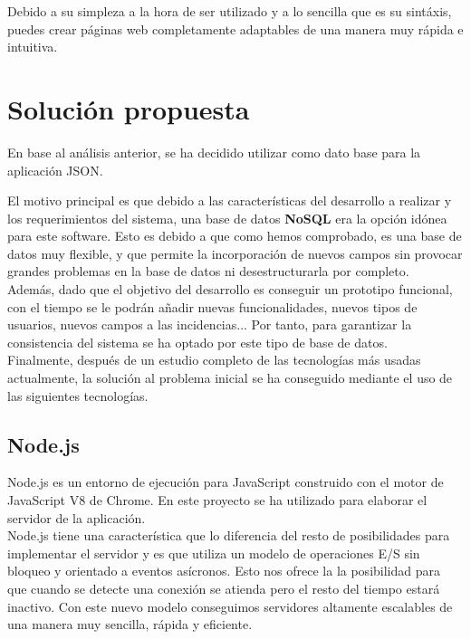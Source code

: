 Debido a su simpleza a la hora de ser utilizado y a lo sencilla que es su sintáxis, puedes crear páginas web completamente adaptables de una manera muy rápida e intuitiva.

\section{Solución propuesta}

En base al análisis anterior, se ha decidido utilizar como dato base para la aplicación JSON\cite{json}.

El motivo principal es que debido a las características del desarrollo a realizar y los requerimientos del sistema,
una base de datos \textbf{NoSQL} era la opción idónea para este software. Esto es debido a que como hemos comprobado,
es una base de datos muy flexible, y que permite la incorporación de nuevos campos sin provocar grandes problemas en 
la base de datos ni desestructurarla por completo.\\

Además, dado que el objetivo del desarrollo es conseguir un prototipo funcional, con el tiempo se le podrán añadir
nuevas funcionalidades, nuevos tipos de usuarios, nuevos campos a las incidencias... Por tanto, para garantizar 
la consistencia del sistema se ha optado por este tipo de base de datos.\\

Finalmente, después de un estudio completo de las tecnologías más usadas actualmente, la solución al problema inicial se ha conseguido 
mediante el uso de las siguientes tecnologías.

\subsection{Node.js}

Node.js es un entorno de ejecución para JavaScript construido con el motor de JavaScript
V8 de Chrome. En este proyecto se ha utilizado para elaborar el servidor de la aplicación.\\

Node.js tiene una característica que lo diferencia del resto de posibilidades para implementar 
el servidor y es que utiliza un modelo de operaciones E/S sin bloqueo y orientado a eventos 
asícronos. Esto nos ofrece la la posibilidad para que cuando se detecte una conexión se atienda
pero el resto del tiempo estará inactivo. Con este nuevo modelo conseguimos servidores altamente 
escalables de una manera muy sencilla, rápida y eficiente.\\

